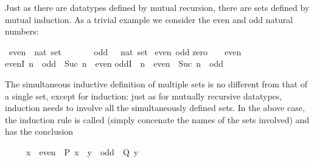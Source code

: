%
\begin{isabellebody}%
\def\isabellecontext{Mutual}%
%
%
\begin{isamarkuptext}%
Just as there are datatypes defined by mutual recursion, there are sets defined
by mutual induction. As a trivial example we consider the even and odd natural numbers:%
\end{isamarkuptext}%
\ even\ {\isacharcolon}{\isacharcolon}\ {\isachardoublequote}nat\ set{\isachardoublequote}\isanewline
\ \ \ \ \ \ \ odd\ \ {\isacharcolon}{\isacharcolon}\ {\isachardoublequote}nat\ set{\isachardoublequote}\isanewline
\isanewline
{}\ even\ odd\isanewline
{}\isanewline
zero{\isacharcolon}\ \ {\isachardoublequote}{}\ {\isasymin}\ even{\isachardoublequote}\isanewline
evenI{\isacharcolon}\ {\isachardoublequote}n\ {\isasymin}\ odd\ {\isasymLongrightarrow}\ Suc\ n\ {\isasymin}\ even{\isachardoublequote}\isanewline
oddI{\isacharcolon}\ \ {\isachardoublequote}n\ {\isasymin}\ even\ {\isasymLongrightarrow}\ Suc\ n\ {\isasymin}\ odd{\isachardoublequote}%
\begin{isamarkuptext}%
\noindent
The simultaneous inductive definition of multiple sets is no different from that
of a single set, except for induction: just as for mutually recursive datatypes,
induction needs to involve all the simultaneously defined sets. In the above case,
the induction rule is called  (simply concenate the names
of the sets involved) and has the conclusion
\begin{isabelle}%
\ \ \ \ \ {\isacharparenleft}{\isacharquery}x\ {\isasymin}\ even\ {\isasymlongrightarrow}\ {\isacharquery}P\ {\isacharquery}x{\isacharparenright}\ {\isasymand}\ {\isacharparenleft}{\isacharquery}y\ {\isasymin}\ odd\ {\isasymlongrightarrow}\ {\isacharquery}Q\ {\isacharquery}y{\isacharparenright}%
\end{isabelle}


\end{isamarkuptext}
\end{isabellebody}
